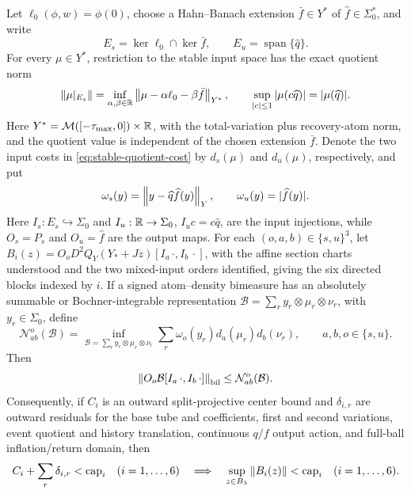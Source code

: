 \begin{proposition}
\label{prop:split-bimeasure-local-graph}
Let \(\ell_0(\phi,w)=\phi(0)\), choose a Hahn--Banach extension
\(\bar f\in Y^*\) of \(\widehat f\in\Sigma_0^*\), and write
\[
 E_s=\ker\ell_0\cap\ker\bar f,
 \qquad E_u=\operatorname{span}\{\widehat q\}.
\]
For every \(\mu\in Y^*\), restriction to the stable input space has the
exact quotient norm
\begin{equation}
 \left\lVert\mu|_{E_s}\right\rVert
 =\inf_{\alpha,\beta\in\mathbb R}
   \left\lVert\mu-\alpha\ell_0-\beta\bar f\right\rVert_{Y^*},
 \qquad
 \sup_{|c|\le1}|\mu(c\widehat q)|=|\mu(\widehat q)|.    \label{eq:stable-quotient-cost}
\end{equation}
Here \(Y^*=\mathcal M([-\tau_{\max},0])\times\mathbb R\), with the total-variation
plus recovery-atom norm, and the quotient value is independent of the chosen
extension \(\bar f\).
Denote the two input costs in \cref{eq:stable-quotient-cost} by
\(d_s(\mu)\) and \(d_u(\mu)\), respectively, and put
\[
 \omega_s(y)=\left\lVert y-\widehat q\widehat f(y)\right\rVert_Y,
 \qquad \omega_u(y)=|\widehat f(y)|.
\]
Here \(I_s:E_s\hookrightarrow\Sigma_0\) and
\(I_u:\mathbb R\to\Sigma_0\), \(I_uc=c\widehat q\), are the input injections,
while \(O_s=P_s\) and \(O_u=\widehat f\) are the output maps.  For each
\((o,a,b)\in\{s,u\}^3\), let
\(B_i(z)=O_oD^2Q_Y(Y_*+Jz)[I_a\,\cdot,I_b\,\cdot]\), with the affine
section charts understood and the two mixed-input orders identified, giving
the six directed blocks indexed by \(i\).
If a signed atom--density bimeasure has an absolutely summable or
Bochner-integrable representation
\(\mathcal B=\sum_r y_r\otimes\mu_r\otimes\nu_r\), with
\(y_r\in\Sigma_0\), define
\[
 \mathcal N_{ab}^{o}(\mathcal B)
 =\inf_{\mathcal B=\sum_r y_r\otimes\mu_r\otimes\nu_r}
   \sum_r\omega_o(y_r)d_a(\mu_r)d_b(\nu_r),
 \qquad a,b,o\in\{s,u\}.
\]
Then
\begin{equation}
 \left\lVert O_o\mathcal B[I_a\,\cdot,I_b\,\cdot]\right\rVert_{\rm bil}
 \le \mathcal N_{ab}^{o}(\mathcal B).                 \label{eq:split-projective-bound}
\end{equation}
Consequently, if \(C_i\) is an outward split-projective center bound and
\(\delta_{i,r}\) are outward residuals for the base tube and coefficients,
first and second variations, event quotient and history translation,
continuous \(q/f\) output action, and full-ball inflation/return domain, then
\begin{equation}
 C_i+\sum_r\delta_{i,r}<\operatorname{cap}_i
 \quad(i=1,\ldots,6)
 \quad\Longrightarrow\quad
 \sup_{z\in B_\lambda}\left\lVert B_i(z)\right\rVert<\operatorname{cap}_i
 \quad(i=1,\ldots,6).                                 \label{eq:six-block-residual-implication}
\end{equation}


\end{proposition}
